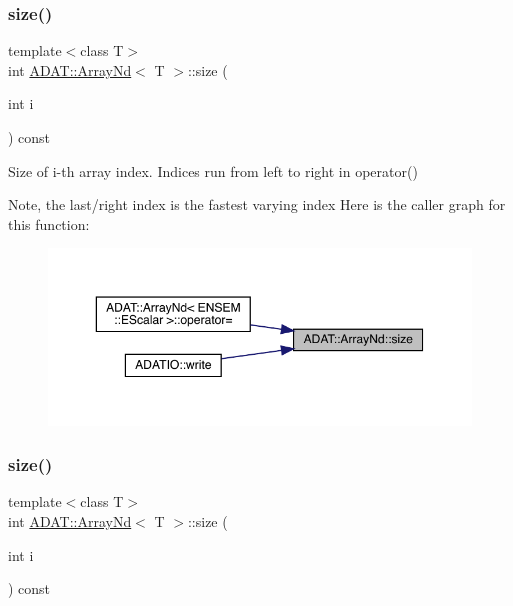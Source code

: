\subsubsection{\texorpdfstring{size()}{size()}\hspace{0.1cm}{\footnotesize\ttfamily [1/4]}}
{\footnotesize\ttfamily template$<$class T$>$ \\
int \mbox{\hyperlink{classADAT_1_1ArrayNd}{A\+D\+A\+T\+::\+Array\+Nd}}$<$ T $>$\+::size (\begin{DoxyParamCaption}\item[{int}]{i }\end{DoxyParamCaption}) const\hspace{0.3cm}{\ttfamily [inline]}}



Size of i-\/th array index. Indices run from left to right in operator() 

Note, the last/right index is the fastest varying index Here is the caller graph for this function\+:\nopagebreak
\begin{figure}[H]
\begin{center}
\leavevmode
\includegraphics[width=350pt]{d1/db2/classADAT_1_1ArrayNd_aa289b2d57b41dc1c61d061865e6cb912_icgraph}
\end{center}
\end{figure}
\mbox{\label{classADAT_1_1ArrayNd_aa289b2d57b41dc1c61d061865e6cb912}} 
\subsubsection{\texorpdfstring{size()}{size()}\hspace{0.1cm}{\footnotesize\ttfamily [2/4]}}
{\footnotesize\ttfamily template$<$class T$>$ \\
int \mbox{\hyperlink{classADAT_1_1ArrayNd}{A\+D\+A\+T\+::\+Array\+Nd}}$<$ T $>$\+::size (\begin{DoxyParamCaption}\item[{int}]{i }\end{DoxyParamCaption}) const\hspace{0.3cm}{\ttfamily [inline]}}



